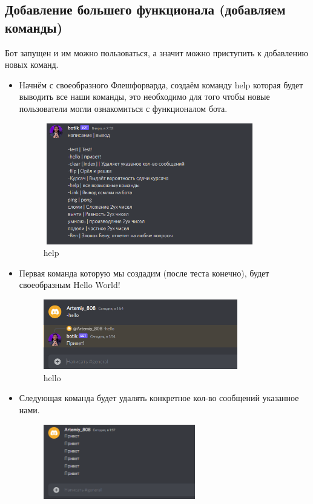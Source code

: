 \documentclass[a4paper,12pt]{article}
\begin{document}
\newpage
\subsection{Добавление большего функционала (добавляем команды)}
Бот запущен и им можно пользоваться, а значит можно приступить к добавлению новых команд.

\begin{itemize}
    \item Начнём с своеобразного Флешфорварда, создаём команду help которая будет выводить все наши команды, это необходимо для того чтобы новые пользователи могли ознакомиться с функционалом бота.
    \begin{figure}[h]
    \centering
    \includegraphics[width = 350px,height = 200px]{pictures/help.png}
    \caption{help}
    \label{fig:my_label9}
\end{figure}
    \item Первая команда которую мы создадим (после теста конечно), будет своеобразным Hello World!
    \begin{figure}[h]
    \centering
    \includegraphics[width = 320px]{pictures/hello.png}
    \caption{hello}
    \label{fig:my_label10}
\end{figure}
\newpage
    \item Следующая команда будет удалять конкретное кол-во сообщений указанное нами.
    \begin{figure}[h]
    \centering
    \includegraphics[width = 250px]{pictures/do.png}

\end{figure}
\end{itemize}
\end{document}
